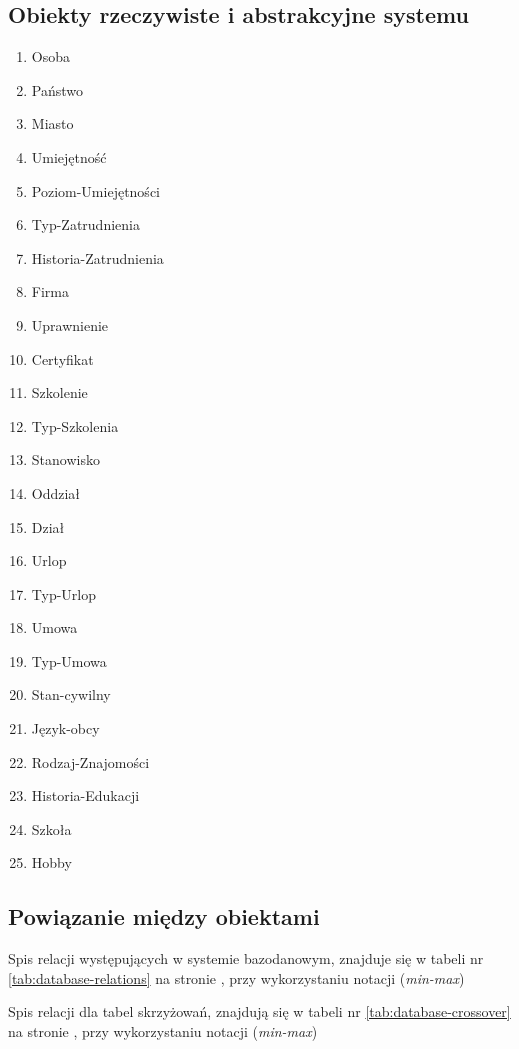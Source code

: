 \documentclass[a4paper]{article}
\begin{document}
\subsection{Obiekty rzeczywiste i abstrakcyjne systemu}
\begin{multicols}{2}
\begin{enumerate}


\item Osoba
\item Państwo
\item Miasto
\item Umiejętność
\item Poziom-Umiejętności
\item Typ-Zatrudnienia
\item Historia-Zatrudnienia
\item Firma
\item Uprawnienie
\item Certyfikat
\item Szkolenie
\item Typ-Szkolenia
\item Stanowisko
\item Oddział
\item Dział
\item Urlop
\item Typ-Urlop
\item Umowa
\item Typ-Umowa
\item Stan-cywilny
\item Język-obcy
\item Rodzaj-Znajomości
\item Historia-Edukacji
\item Szkoła
\item Hobby
\end{enumerate}
\end{multicols}
\subsection{Powiązanie między obiektami}
Spis relacji występujących w systemie bazodanowym, znajduje się w tabeli nr \ref{tab:database-relations} na stronie \pageref{tab:database-relations}, przy wykorzystaniu notacji (\emph{min-max})



Spis relacji dla tabel skrzyżowań, znajdują się w tabeli nr \ref{tab:database-crossover} na stronie \pageref{tab:database-crossover}, przy wykorzystaniu notacji (\emph{min-max})
\end{document}
